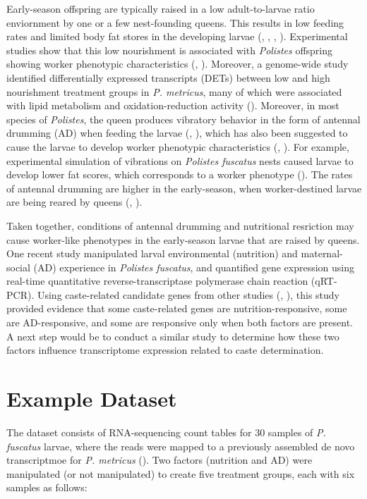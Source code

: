\documentclass[11pt,a4paper,oldfontcommands,openany]{memoir}
\numberwithin{equation}{section} %
\begin{document}
Early-season offspring are typically raised in a low adult-to-larvae ratio enviornment by one or a few nest-founding queens. This results in low feeding rates and limited body fat stores in the developing larvae (\citealt{pw6}, \citealt{pw7}, \citealt{pw8}, \citealt{pw9}). Experimental studies show that this low nourishment is associated with \textit{Polistes} offspring showing worker phenotypic characteristics (\citealt{pw10}, \citealt{pw11}). Moreover, a genome-wide study identified differentially expressed transcripts (DETs) between low and high nourishment treatment groups in \textit{P. metricus}, many of which were associated with lipid metabolism and oxidation-reduction activity (\citealt{pw1}). Moreover, in most species of \textit{Polistes}, the queen produces vibratory behavior in the form of antennal drumming (AD) when feeding the larvae (\citealt{pw12}, \citealt{pw13}), which has also been suggested to cause the larvae to develop worker phenotypic characteristics (\citealt{pw12}, \citealt{pw14}). For example, experimental simulation of vibrations on \textit{Polistes fuscatus} nests caused larvae to develop lower fat scores, which corresponds to a worker phenotype (\citealt{pw2}). The rates of antennal drumming are higher in the early-season, when worker-destined larvae are being reared by queens (\citealt{pw15}, \citealt{pw16}).

Taken together, conditions of antennal drumming and nutritional resriction may cause worker-like phenotypes in the early-season larvae that are raised by queens. One recent study manipulated larval environmental (nutrition) and maternal-social (AD) experience in \textit{Polistes fuscatus}, and quantified gene expression using real-time quantitative reverse-transcriptase polymerase chain reaction (qRT-PCR). Using caste-related candidate genes from other studies (\citealt{pw17}, \citealt{pw18}), this study provided evidence that some caste-related genes are nutrition-responsive, some are AD-responsive, and some are responsive only when both factors are present. A next step would be to conduct a similar study to determine how these two factors influence transcriptome expression related to caste determination.

\section{Example Dataset}

The dataset consists of RNA-sequencing count tables for 30 samples of \textit{P. fuscatus} larvae, where the reads were mapped to a previously assembled de novo transcriptmoe for \textit{P. metricus} (\citealt{pw19}). Two factors (nutrition and AD) were manipulated (or not manipulated) to create five treatment groups, each with six samples as follows:
\end{document}
